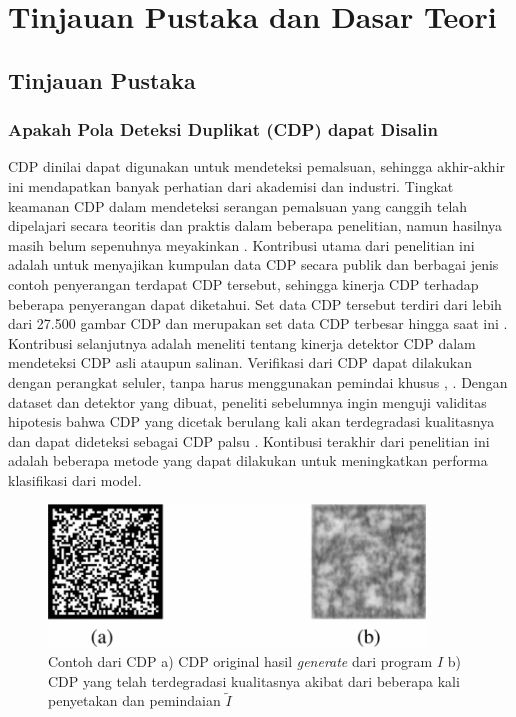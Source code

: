 \chapter{Tinjauan Pustaka dan Dasar Teori}

\section{Tinjauan Pustaka}

\subsection{Apakah Pola Deteksi Duplikat (CDP) dapat Disalin}
CDP dinilai dapat digunakan untuk mendeteksi pemalsuan, sehingga akhir-akhir ini mendapatkan banyak perhatian dari akademisi dan industri. Tingkat keamanan CDP
dalam mendeteksi serangan pemalsuan yang canggih telah dipelajari secara teoritis dan praktis dalam beberapa penelitian, namun hasilnya masih belum sepenuhnya
meyakinkan \cite{PICARDCANCOPYDETECTIONPATTERN}. Kontribusi utama dari penelitian ini adalah untuk menyajikan kumpulan data CDP secara publik dan berbagai
jenis contoh penyerangan terdapat CDP tersebut, sehingga kinerja CDP terhadap beberapa penyerangan dapat diketahui. Set data CDP tersebut terdiri dari lebih
dari 27.500 gambar CDP dan merupakan set data CDP terbesar hingga saat ini \cite{PICARDCANCOPYDETECTIONPATTERN}. Kontribusi selanjutnya adalah meneliti tentang
kinerja detektor CDP dalam mendeteksi CDP asli ataupun salinan. Verifikasi dari CDP dapat dilakukan dengan perangkat seluler, tanpa harus menggunakan pemindai
khusus \cite{WONG2017}, \cite{SCHRAML2018REAL}. Dengan dataset dan detektor yang dibuat, peneliti sebelumnya ingin menguji validitas hipotesis bahwa CDP yang
dicetak berulang kali akan terdegradasi kualitasnya dan dapat dideteksi sebagai CDP palsu \cite{PICARDCANCOPYDETECTIONPATTERN}. Kontibusi terakhir dari
penelitian ini adalah beberapa metode yang dapat dilakukan untuk meningkatkan performa klasifikasi dari model.

\begin{figure}[h]
	\centering
	\includegraphics[width=10cm]{contents/chapter-2/2-cdporivsfake.png}
	\caption{Contoh dari CDP a) CDP original hasil \emph{generate} dari program $I$ b) CDP yang telah terdegradasi kualitasnya akibat dari beberapa kali penyetakan dan pemindaian $\widetilde{I}$ \cite{PICARDCANCOPYDETECTIONPATTERN}}
	\label{Fig: 2-cdporivsfake}
\end{figure}

